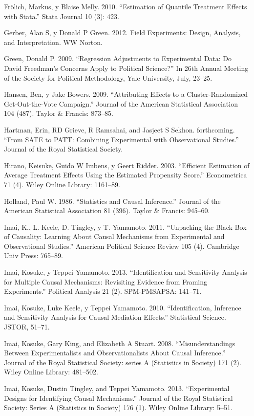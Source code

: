 \documentclass[
]{article}
\begin{document}
Frölich, Markus, y Blaise Melly. 2010. ``Estimation of Quantile
Treatment Effects with Stata.'' Stata Journal 10 (3): 423.

Gerber, Alan S, y Donald P Green. 2012. Field Experiments: Design,
Analysis, and Interpretation. WW Norton.

Green, Donald P. 2009. ``Regression Adjustments to Experimental Data: Do
David Freedman's Concerns Apply to Political Science?'' In 26th Annual
Meeting of the Society for Political Methodology, Yale University, July,
23--25.

Hansen, Ben, y Jake Bowers. 2009. ``Attributing Effects to a
Cluster-Randomized Get-Out-the-Vote Campaign.'' Journal of the American
Statistical Association 104 (487). Taylor \& Francis: 873--85.

Hartman, Erin, RD Grieve, R Ramsahai, and Jasjeet S Sekhon. forthcoming.
``From SATE to PATT: Combining Experimental with Observational
Studies.'' Journal of the Royal Statistical Society.

Hirano, Keisuke, Guido W Imbens, y Geert Ridder. 2003. ``Efficient
Estimation of Average Treatment Effects Using the Estimated Propensity
Score.'' Econometrica 71 (4). Wiley Online Library: 1161--89.

Holland, Paul W. 1986. ``Statistics and Causal Inference.'' Journal of
the American Statistical Association 81 (396). Taylor \& Francis:
945--60.

Imai, K., L. Keele, D. Tingley, y T. Yamamoto. 2011. ``Unpacking the
Black Box of Causality: Learning About Causal Mechanisms from
Experimental and Observational Studies.'' American Political Science
Review 105 (4). Cambridge Univ Press: 765--89.

Imai, Kosuke, y Teppei Yamamoto. 2013. ``Identification and Sensitivity
Analysis for Multiple Causal Mechanisms: Revisiting Evidence from
Framing Experiments.'' Political Analysis 21 (2). SPM-PMSAPSA: 141--71.

Imai, Kosuke, Luke Keele, y Teppei Yamamoto. 2010. ``Identification,
Inference and Sensitivity Analysis for Causal Mediation Effects.''
Statistical Science. JSTOR, 51--71.

Imai, Kosuke, Gary King, and Elizabeth A Stuart. 2008.
``Misunderstandings Between Experimentalists and Observationalists About
Causal Inference.'' Journal of the Royal Statistical Society: series A
(Statistics in Society) 171 (2). Wiley Online Library: 481--502.

Imai, Kosuke, Dustin Tingley, and Teppei Yamamoto. 2013. ``Experimental
Designs for Identifying Causal Mechanisms.'' Journal of the Royal
Statistical Society: Series A (Statistics in Society) 176 (1). Wiley
Online Library: 5--51.
\end{document}
